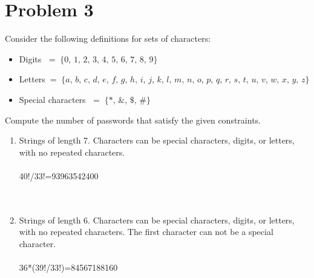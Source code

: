 \documentclass{amsart}
\theoremstyle{definition}
\theoremstyle{Exercise}
\theoremstyle{remark}
\theoremstyle{rule}
\numberwithin{equation}{section}
\begin{document}
   
   \newpage

\section*{Problem 3}
   
   
\item Consider the following definitions for sets of characters:
\begin{itemize}
  \item Digits $\;=\; \{ 0,\, 1,\, 2,\, 3,\, 4,\, 5,\, 6,\, 7,\, 8,\, 9 \}$\\
  \item Letters$\; = \;\{ a,\, b,\, c, \,d,\, e,\, f,\, g,\, h,\, i,\, j,\, k,\, l,\, m,\, n,\, o,\, p,\, q,\, r,\, s,\, t,\, u,\, v,\, w,\, x,\, y,\, z \}$\\
  \item Special characters $\;=\; \{ *,\, \&,\, \$,\, \# \}$\\
\end{itemize}

Compute the number of passwords that satisfy the given constraints.
    \begin{enumerate}[label=(\roman*)]
    \item Strings of length 7. Characters can be special characters, digits, or letters, with no repeated characters.\\\\
40!/33!=93963542400\\

\\\\
    \item Strings of length 6. Characters can be special characters, digits, or letters, with no repeated characters. The first character can not be a special character.\\\\
36*(39!/33!)=84567188160\\
      \end{enumerate}
 \newpage
\end{document}
